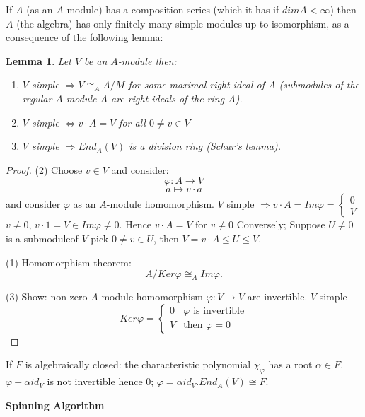\documentclass[12pt]{amsart}
\newtheorem{lemma}[theorem]{Lemma}
\theoremstyle{definition}
\begin{document}
If $A$ (as an $A$-module) has a composition series (which it has if $dimA < \infty$) then $A$ (the algebra) has only finitely many simple modules up to isomorphism, as a consequence of the following lemma:
\begin{lemma}
\label{simple}
Let $V$ be an $A$-module then:
\begin{enumerate}
\item $V$ simple $\Rightarrow V \cong_{A} A / M$ for some maximal right ideal of $A$ (submodules of the regular $A$-module $A$ are right ideals of the ring $A$).
\item $V$ simple $\Leftrightarrow v \cdot A = V$ for all $0 \neq v \in V$
\item $V$ simple $\Rightarrow End_{A} (V)$ is a division ring (Schur's lemma).
\end{enumerate}
\end{lemma}

 \begin{proof}
(2) Choose $v \in V$ and consider: $$\varphi: A \rightarrow V$$ $$a \mapsto v \cdot a$$
and consider $\varphi$ as an $A$-module homomorphism. $V$ simple $\Rightarrow v \cdot A = Im \varphi = \begin{cases}
0\\
V
\end{cases}$
$v \neq 0$, $v \cdot 1 = V \in Im \varphi \neq 0$. Hence $v \cdot A = V$ for $v \neq 0$
Conversely; Suppose $U \neq 0$ is a submoduleof $V$ pick $0 \neq v \in U$, then $V = v \cdot A \leq U \leq V$.

(1) Homomorphism theorem: $$A / Ker \varphi \cong_{A} Im \varphi.$$

(3) Show: non-zero $A$-module homomorphism $\varphi: V \rightarrow V$ are invertible. $V$ simple $$Ker \varphi = \begin{cases}
0 & \varphi \mbox{ is invertible}\\
V & \mbox{then }\varphi = 0
\end{cases}$$
\end{proof}

If $F$ is algebraically closed: the characteristic polynomial $\chi_{\varphi}$ has a root $\alpha \in F$. $\varphi-\alpha id_{V}$ is not invertible hence 0; $\varphi = \alpha id_{V}. End_{A} (V) \cong F$.

\begin{center}
\textbf{Spinning Algorithm}
\end{center}
\end{document}
